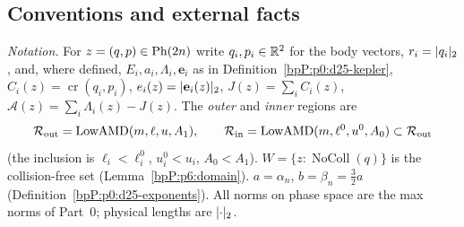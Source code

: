 \subsection{Conventions and external facts}\label{bpP:p14:conv}

\emph{Notation.} For $z=(q,p)\in\mathrm{Ph}(2n)$ write $q_i,p_i\in\mathbb{R}^2$ for the body vectors, $r_i=\lvert q_i\rvert_2$, and, where defined, $E_i,a_i,\Lambda_i,\mathbf e_i$ as in Definition~\ref{bpP:p0:d25-kepler},
$C_i(z)=\operatorname{cr}(q_i,p_i)$, $e_i(z)=\lvert \mathbf e_i(z)\rvert_2$, $J(z)=\sum_iC_i(z)$, $\mathcal A(z)=\sum_i\Lambda_i(z)-J(z)$. The \emph{outer} and \emph{inner} regions are
\[\mathcal R_{\rm out}=\operatorname{LowAMD}(m,\ell,u,A_1),\qquad\mathcal R_{\rm in}=\operatorname{LowAMD}(m,\ell^0,u^0,A_0)\subset\mathcal R_{\rm out}\]
(the inclusion is $\ell_i<\ell_i^0$, $u_i^0<u_i$, $A_0<A_1$). $W=\{z:\operatorname{NoColl}(q)\}$ is the collision-free set (Lemma~\ref{bpP:p6:domain}). $a=\alpha_n$, $b=\beta_n=\tfrac32a$ (Definition~\ref{bpP:p0:d25-exponents}).
All norms on phase space are the max norms of Part~0; physical lengths are $\lvert \cdot\rvert_2$.

